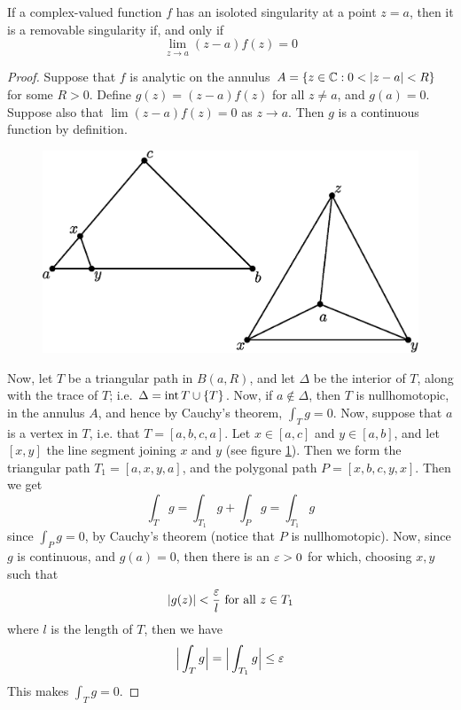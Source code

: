 \begin{theorem}\label{5.1.1}
    If a complex-valued function $f$ has an isoloted singularity at a point
    $z=a$, then it is a removable singularity if, and only if
    \begin{equation*}
        \lim_{z \xrightarrow{} a}{(z-a)f(z)}=0
    \end{equation*}
\end{theorem}
\begin{proof}
    Suppose that $f$ is analytic on the annulus $A=\{z \in \C : 0<|z-a|<R\}$
    for some $R>0$. Define  $g(z)=(z-a)f(z)$ for all $z \neq a$, and  $g(a)=0$.
    Suppose also that $\lim{(z-a)f(z)}=0$ as $z \xrightarrow{} a$. Then $g$ is a
    continuous function by definition.

     \begin{figure}[h]
        \centering
        \includegraphics[scale=0.5]{Figures/Chapter5/isolated_sigularities.eps}
        \caption{}
        \label{figure_5.1}
    \end{figure}

    Now, let $T$ be a triangular path in  $B(a,R)$, and let $\Delta$ be the
    interior of $T$, along with the trace of $T$; i.e.  $\Delta=\operatorname{int}{T} \cup
    \{T\}$. Now, if $a \notin \Delta$, then  $T$ is nullhomotopic, in the
    annulus  $A$, and hence by Cauchy's theorem,  $\int_T{g}=0$. Now, suppose
    that $a$ is a vertex in  $T$, i.e. that  $T=[a,b,c,a]$. Let $x \in [a,c]$
    and $y \in [a,b]$, and let $[x,y]$ the line segment joining $x$ and  $y$
    (see figure \ref{figure_5.1}). Then we form the triangular path
    $T_1=[a,x,y,a]$, and the polygonal path $P=[x,b,c,y,x]$. Then we get
    \begin{equation*}
        \int_T{g}=\int_{T_1}{g}+\int_{P}{g}=\int_{T_1}{g}
    \end{equation*}
    since $\int_P{g}=0$, by Cauchy's theorem (notice that $P$ is nullhomotopic).
    Now, since $g$ is continuous, and  $g(a)=0$, then there is an $\varepsilon>0$ for
    which, choosing  $x,y$ such that
    \begin{equation*}
        |g(z)|<\frac{\varepsilon}{l} \text{ for all } z \in T_1
    \end{equation*}
    where $l$ is the length of $T$, then we have
    \begin{equation*}
        \Big{|} \int_{T}{g} \Big{|}=\Big{|} \int_{T_1}{g} \Big{|} \leq \varepsilon
    \end{equation*}
    This makes $\int_T{g}=0$.


\end{proof}

